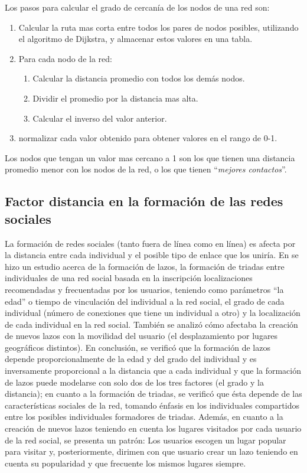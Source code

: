 Los pasos para calcular el grado de cercanía de los nodos de una red son:

\begin{enumerate}
  \item Calcular la ruta mas corta entre todos los pares de nodos posibles, utilizando el algoritmo de Dijkstra, y almacenar estos valores en una tabla.
  \item Para cada nodo de la red:
  \begin{enumerate}
    \item Calcular la distancia promedio con todos los demás nodos.
    \item Dividir el promedio por la distancia mas alta.
    \item Calcular el inverso del valor anterior.
  \end{enumerate}
  \item normalizar cada valor obtenido para obtener valores en el rango de 0-1.
\end{enumerate}

Los nodos que tengan un valor mas cercano a 1 son los que tienen una distancia promedio menor con los nodos de la red, o los que tienen ``\textit{mejores contactos}''.

\subsection{Factor distancia en la formación de las redes sociales}

La formación de redes sociales (tanto fuera de línea como en línea) es afecta por la distancia entre cada individual y el posible tipo de enlace que los uniría. En \cite{evolution} se hizo un estudio acerca de la formación de lazos, la formación de triadas entre individuales de una red social basada en la inscripción localizaciones recomendadas y frecuentadas por los usuarios, teniendo como parámetros ``la edad'' o tiempo de vinculación del individual a la red social, el grado de cada individual (número de conexiones que tiene un individual a otro) y la localización de cada individual en la red social. También se analizó cómo afectaba la creación de nuevos lazos con la movilidad del usuario (el desplazamiento por lugares geográficos distintos). En conclusión, se verificó que la formación de lazos depende proporcionalmente de la edad y del grado del individual y es inversamente proporcional a la distancia que a cada individual y que la formación de lazos puede modelarse con solo dos de los tres factores (el grado y la distancia); en cuanto a la formación de triadas, se verificó que ésta depende de las características sociales de la red, tomando énfasis en los individuales compartidos entre los posibles individuales formadores de triadas. Además, en cuanto a la creación de nuevos lazos teniendo en cuenta los lugares visitados por cada usuario de la red social, se presenta un patrón: Los usuarios escogen un lugar popular para visitar y, posteriormente, dirimen con que usuario crear un lazo teniendo en cuenta su popularidad y que frecuente los mismos lugares siempre.


